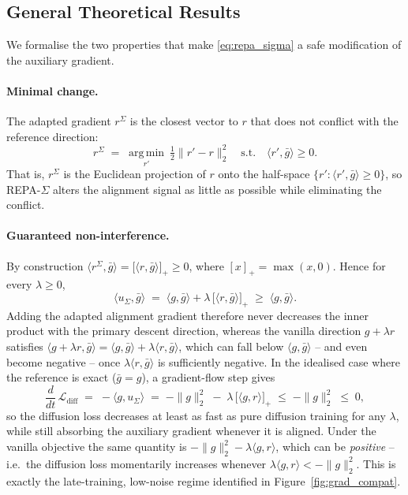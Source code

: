 \subsection{General Theoretical Results}
\label{sec:repa_sigma_theory}

We formalise the two properties that make \eqref{eq:repa_sigma} a safe modification of the auxiliary gradient.

\paragraph{Minimal change.}
The adapted gradient $r^{\Sigma}$ is the closest vector to $r$ that does not conflict with the reference direction:
\[
  r^{\Sigma}
  \;=\;
  \operatorname*{arg\,min}_{r'} \ \tfrac{1}{2}\|r' - r\|_2^2
  \quad \text{s.t.} \quad
  \langle r', \bar g\rangle \ge 0 .
\]
That is, $r^{\Sigma}$ is the Euclidean projection of $r$ onto the half-space $\{r' : \langle r', \bar g\rangle \ge 0\}$,
so REPA-$\Sigma$ alters the alignment signal as little as possible while eliminating the conflict.

\paragraph{Guaranteed non-interference.}
By construction $\langle r^{\Sigma}, \bar g\rangle = \big[\langle r, \bar g\rangle\big]_{+} \ge 0$, where
$[x]_{+}=\max(x,0)$. Hence for every $\lambda \ge 0$,
\[
  \langle u_{\Sigma}, \bar g\rangle
  \;=\;
  \langle g, \bar g\rangle + \lambda\,\big[\langle r, \bar g\rangle\big]_{+}
  \;\ge\;
  \langle g, \bar g\rangle .
\]
Adding the adapted alignment gradient therefore never decreases the inner product with the primary descent direction,
whereas the vanilla direction $g + \lambda r$ satisfies $\langle g+\lambda r, \bar g\rangle = \langle g,\bar g\rangle +
\lambda\langle r,\bar g\rangle$, which can fall below $\langle g,\bar g\rangle$ -- and even become negative -- once
$\lambda\langle r,\bar g\rangle$ is sufficiently negative. In the idealised case where the reference is exact
($\bar g = g$), a gradient-flow step gives
\[
  \frac{d}{dt}\,\mathcal{L}_{\mathrm{diff}}
  \;=\;
  -\langle g, u_{\Sigma}\rangle
  \;=\;
  -\|g\|_2^2 \;-\; \lambda\,\big[\langle g, r\rangle\big]_{+}
  \;\le\; -\|g\|_2^2 \;\le\; 0,
\]
so the diffusion loss decreases at least as fast as pure diffusion training for any $\lambda$, while still absorbing the
auxiliary gradient whenever it is aligned. Under the vanilla objective the same quantity is $-\|g\|_2^2 -
\lambda\langle g,r\rangle$, which can be \emph{positive} -- i.e.\ the diffusion loss momentarily increases whenever
$\lambda\langle g,r\rangle < -\|g\|_2^2$. This is exactly the late-training, low-noise regime identified in
Figure~\ref{fig:grad_compat}.

